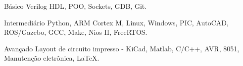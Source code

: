 

\begin{cvskills}

  \cvskill
    {Básico} %
    {Verilog HDL, POO, Sockets, GDB, Git.} %

  \cvskill
    {Intermediário} %
    {Python, ARM Cortex M, Linux, Windows, PIC, AutoCAD, ROS/Gazebo, GCC, Make, Nios II, FreeRTOS.} %

  \cvskill
    {Avançado} %
    {Layout de circuito impresso - KiCad, Matlab, C/C++, AVR, 8051, Manutenção eletrônica, LaTeX.} %

\end{cvskills}




